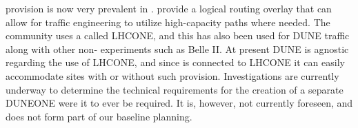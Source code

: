 \documentclass[../main-v1.tex]{subfiles}
\begin{document}
  provision is now very prevalent in . 
  provide a logical routing overlay that can allow for traffic engineering to utilize high-capacity paths where needed. The  community uses a  called LHCONE, and this has also been used for DUNE traffic along with other non- experiments such as Belle II. 
At present DUNE is agnostic %
regarding the use of LHCONE, and since  is connected to LHCONE it can easily accommodate sites with or without such provision.
Investigations are currently underway to determine the technical requirements for the creation of a separate DUNEONE  were it to ever be required. It is, however, not currently foreseen, and does not form part of our baseline planning.
\end{document}
